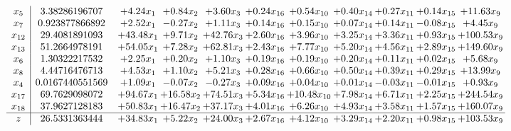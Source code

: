 \documentclass[9pt]{article}
\begin{document}
\[\begin{array}{c| c c@{\hskip 2pt} c@{\hskip 2pt} c@{\hskip 2pt} c@{\hskip 2pt} c@{\hskip 2pt} c@{\hskip 2pt} c@{\hskip 2pt} c@{\hskip 2pt} c@{\hskip 2pt} }
 x_{5}   &  3.38286196707 & +  4.24 x_{1} & +  0.84 x_{2} & +  3.60 x_{3} & +  0.24 x_{16} & +  0.54 x_{10} & +  0.40 x_{14} & +  0.27 x_{11} & +  0.14 x_{15} & + 11.63 x_{9}\\
 x_{7}   &  0.923877866892 & +  2.52 x_{1} & -0.27 x_{2} & +  1.11 x_{3} & +  0.14 x_{16} & +  0.15 x_{10} & +  0.07 x_{14} & +  0.14 x_{11} & -0.08 x_{15} & +  4.45 x_{9}\\
 x_{12}   &  29.4081891093 & + 43.48 x_{1} & +  9.71 x_{2} & + 42.76 x_{3} & +  2.60 x_{16} & +  3.96 x_{10} & +  3.25 x_{14} & +  3.36 x_{11} & +  0.93 x_{15} & + 100.53 x_{9}\\
 x_{13}   &  51.2664978191 & + 54.05 x_{1} & +  7.28 x_{2} & + 62.81 x_{3} & +  2.43 x_{16} & +  7.77 x_{10} & +  5.20 x_{14} & +  4.56 x_{11} & +  2.89 x_{15} & + 149.60 x_{9}\\
 x_{6}   &  1.30322217532 & +  2.25 x_{1} & +  0.20 x_{2} & +  1.10 x_{3} & +  0.19 x_{16} & +  0.19 x_{10} & +  0.20 x_{14} & +  0.11 x_{11} & +  0.02 x_{15} & +  5.68 x_{9}\\
 x_{8}   &  4.44716476713 & +  4.53 x_{1} & +  1.10 x_{2} & +  5.21 x_{3} & +  0.28 x_{16} & +  0.66 x_{10} & +  0.50 x_{14} & +  0.39 x_{11} & +  0.29 x_{15} & + 13.99 x_{9}\\
 x_{4}   &  0.0167440551569 & +  1.09 x_{1} & -0.07 x_{2} & -0.27 x_{3} & +  0.09 x_{16} & +  0.04 x_{10} & +  0.01 x_{14} & -0.03 x_{11} & -0.01 x_{15} & +  0.93 x_{9}\\
 x_{17}   &  69.7629098072 & + 94.67 x_{1} & + 16.58 x_{2} & + 74.51 x_{3} & +  5.34 x_{16} & + 10.48 x_{10} & +  7.98 x_{14} & +  6.71 x_{11} & +  2.25 x_{15} & + 244.54 x_{9}\\
 x_{18}   &  37.9627128183 & + 50.83 x_{1} & + 16.47 x_{2} & + 37.17 x_{3} & +  4.01 x_{16} & +  6.26 x_{10} & +  4.93 x_{14} & +  3.58 x_{11} & +  1.57 x_{15} & + 160.07 x_{9}\\
\hline
z    &  26.5331363444 & + 34.83 x_{1} & +  5.22 x_{2} & + 24.00 x_{3} & +  2.67 x_{16} & +  4.12 x_{10} & +  3.29 x_{14} & +  2.20 x_{11} & +  0.98 x_{15} & + 103.53 x_{9}\\
\end{array}\]
\end{document}
